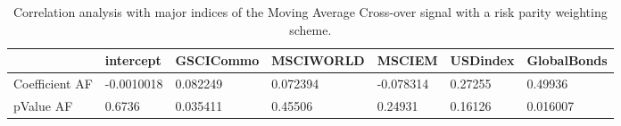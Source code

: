 \begin{table}[H]
\centering
\begin{tabular}{lllllll}
& intercept & GSCICommo & MSCIWORLD & MSCIEM & USDindex & GlobalBonds \\ 
\hline 
Coefficient AF & -0.0010018 & 0.082249 & 0.072394 & -0.078314 & 0.27255 & 0.49936 \\ 
pValue AF & 0.6736 & 0.035411 & 0.45506 & 0.24931 & 0.16126 & 0.016007 \\ 
\hline
\end{tabular}
\caption{Correlation analysis with major indices of the Moving Average Cross-over signal with a risk parity weighting scheme.}
\label{MARP_AFACTOR}
\end{table}